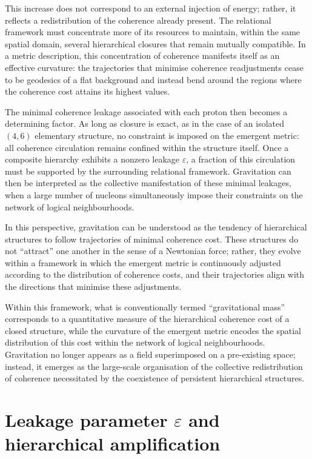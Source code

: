 \documentclass[11pt,a4paper]{article}
\begin{document}
This increase does not correspond to an external injection of energy; rather, it reflects a redistribution of the coherence already present. The relational framework must concentrate more of its resources to maintain, within the same spatial domain, several hierarchical closures that remain mutually compatible. In a metric description, this concentration of coherence manifests itself as an effective curvature: the trajectories that minimise coherence readjustments cease to be geodesics of a flat background and instead bend around the regions where the coherence cost attains its highest values.

The minimal coherence leakage associated with each proton then becomes a determining factor. As long as closure is exact, as in the case of an isolated \((4,6)\) elementary structure, no constraint is imposed on the emergent metric: all coherence circulation remains confined within the structure itself. Once a composite hierarchy exhibits a nonzero leakage \(\varepsilon\), a fraction of this circulation must be supported by the surrounding relational framework. Gravitation can then be interpreted as the collective manifestation of these minimal leakages, when a large number of nucleons simultaneously impose their constraints on the network of logical neighbourhoods. 

In this perspective, gravitation can be understood as the tendency of hierarchical structures to follow trajectories of minimal coherence cost. These structures do not “attract” one another in the sense of a Newtonian force; rather, they evolve within a framework in which the emergent metric is continuously adjusted according to the distribution of coherence costs, and their trajectories align with the directions that minimise these adjustments. 

Within this framework, what is conventionally termed “gravitational mass” corresponds to a quantitative measure of the hierarchical coherence cost of a closed structure, while the curvature of the emergent metric encodes the spatial distribution of this cost within the network of logical neighbourhoods. Gravitation no longer appears as a field superimposed on a pre-existing space; instead, it emerges as the large-scale organisation of the collective redistribution of coherence necessitated by the coexistence of persistent hierarchical structures.

\section{\texorpdfstring{Leakage parameter \(\varepsilon\) and hierarchical amplification}{Leakage parameter epsilon and hierarchical amplification}}
\end{document}
